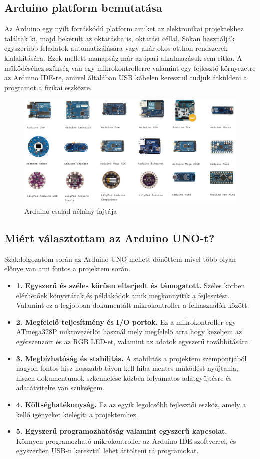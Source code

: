 \documentclass[]{thesis-ekf}
\theoremstyle{definition}
\theoremstyle{remark}
\begin{document}
\subsection{Arduino platform bemutatása}
Az Arduino\cite{arduino} egy nyílt forráskódú platform amiket az elektronikai projektekhez találtak ki, majd bekerült az oktatásba is, oktatási céllal. Sokan használják egyszerűbb feladatok automatizálására vagy akár okos otthon rendszerek kialakítására. Ezek mellett manapság már az ipari alkalmazásuk sem ritka. A működéséhez szükség van egy mikrokontrollerre valamint egy fejlesztő környezetre az Arduino IDE-re, amivel általában USB kábelen keresztül tudjuk átküldeni a programot a fizikai eszközre.
\begin{figure}[th!]
	\centering
	\includegraphics[width=0.9\linewidth]{ArduinoFamily}
	\caption[Arduino család néhány fajtája]{Arduino család néhány fajtája}
	\label{fig-arduinofamily}
\end{figure}
\subsection{Miért választottam az Arduino UNO-t?}
Szakdolgozatom során az Arduino UNO mellett dönöttem mivel több olyan előnye van ami fontos a projektem során.
\begin{itemize}
	\item \textbf{1. Egyszerű és széles körűen elterjedt és támogatott.} Széles körben elérhetőek könyvtárak és példakódok amik megkönnyítik a fejlesztést. Valamint ez a legjobban dokumentált mikrokontroller a felhasználók között.
	\item \textbf{2. Megfelelő teljesítmény és I/O portok.} Ez a mikrokontroller egy ATmega328P mikrovezérlőt használ mely megfelelő arra hogy kezeljem az egérszenzort és az RGB LED-et, valamint az adatok egyszerű továbbítására.
	\item \textbf{3. Megbízhatóság és stabilitás.} A stabilitás a projektem szempontjából nagyon fontos hisz hosszabb távon kell hiba mentes működést nyújtania, hiszen dokumentumok szkennelése közben folyamatos adatgyűjtésre és adatátvitelre van szükségem.
	\item \textbf{4. Költséghatékonyság.} Ez az egyik legolcsóbb fejlesztői eszköz, amely a kellő igényeket kielégíti a projektemhez.
	\item \textbf{5. Egyszerű programozhatóság valamint egyszerű kapcsolat.} Könnyen programozható mikrokontroller az Arduino IDE szoftverrel, és egyszerűen USB-n keresztül lehet áttölteni rá programokat.
\end{itemize}
\end{document}

